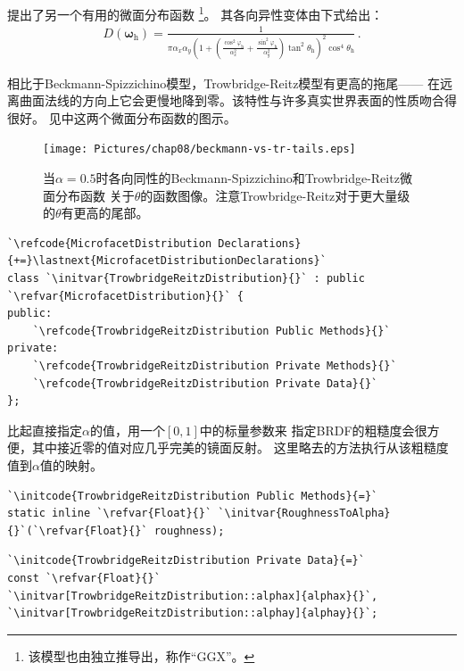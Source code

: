 \citet{Trowbridge:75}提出了另一个有用的微面分布函数
\footnote{该模型也由\citet{10.5555/2383847.2383874}独立推导出，称作“GGX”。}。
其各向异性变体由下式给出：
\begin{align}\label{eq:8.11}
    D({\bm\omega}_{\mathrm{h}})=\frac{1}{\pi\alpha_x\alpha_y\left(1+\left(\frac{\cos^2\varphi_{\mathrm{h}}}{\alpha_x^2}+\frac{\sin^2\varphi_{\mathrm{h}}}{\alpha_y^2}\right)\tan^2\theta_{\mathrm{h}}\right)^2\cos^4\theta_{\mathrm{h}}}\, .
\end{align}

相比于Beckmann-Spizzichino模型，Trowbridge-Reitz模型有更高的拖尾——
在远离曲面法线的方向上它会更慢地降到零。该特性与许多真实世界表面的性质吻合得很好。
见中这两个微面分布函数的图示。
\begin{figure}[htbp]
    \centering
    \texttt{[image: Pictures/chap08/beckmann-vs-tr-tails.eps]}
    \caption{当$\alpha=0.5$时各向同性的Beckmann-Spizzichino和Trowbridge-Reitz微面分布函数
        关于$\theta$的函数图像。注意Trowbridge-Reitz对于更大量级的$\theta$有更高的尾部。}
    \label{fig:8.16}
\end{figure}

\begin{lstlisting}
`\refcode{MicrofacetDistribution Declarations}{+=}\lastnext{MicrofacetDistributionDeclarations}`
class `\initvar{TrowbridgeReitzDistribution}{}` : public `\refvar{MicrofacetDistribution}{}` {
public:
    `\refcode{TrowbridgeReitzDistribution Public Methods}{}`
private:
    `\refcode{TrowbridgeReitzDistribution Private Methods}{}`
    `\refcode{TrowbridgeReitzDistribution Private Data}{}`
};
\end{lstlisting}

比起直接指定$\alpha$的值，用一个$[0,1]$中的标量参数来
指定BRDF的粗糙度会很方便，其中接近零的值对应几乎完美的镜面反射。
这里略去的方法执行从该粗糙度值到$\alpha$值的映射。
\begin{lstlisting}
`\initcode{TrowbridgeReitzDistribution Public Methods}{=}`
static inline `\refvar{Float}{}` `\initvar{RoughnessToAlpha}{}`(`\refvar{Float}{}` roughness);
\end{lstlisting}
\begin{lstlisting}
`\initcode{TrowbridgeReitzDistribution Private Data}{=}`
const `\refvar{Float}{}` `\initvar[TrowbridgeReitzDistribution::alphax]{alphax}{}`, `\initvar[TrowbridgeReitzDistribution::alphay]{alphay}{}`;
\end{lstlisting}

